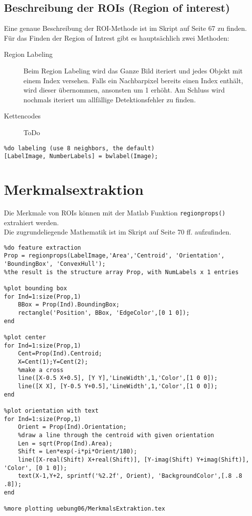 \subsection{Beschreibung der ROIs (Region of interest)}
Eine genaue Beschreibung der ROI-Methode ist im Skript auf Seite 67 zu finden.\\
Für das Finden der Region of Intrest gibt es hauptsächlich zwei Methoden:
\begin{description}
    \item[Region Labeling] Beim Region Labeling wird das Ganze Bild iteriert und jedes Objekt mit einem Index versehen. Falls ein Nachbarpixel bereits einen Index enthält, wird dieser übernommen, ansonsten um 1 erhöht. Am Schluss wird nochmals iteriert um allfällige Detektionsfehler zu finden.
    \item[Kettencodes] ToDo
\end{description}
\begin{lstlisting}
%do labeling (use 8 neighbors, the default)
[LabelImage, NumberLabels] = bwlabel(Image);
\end{lstlisting}

\section{Merkmalsextraktion}
Die Merkmale von ROIs können mit der Matlab Funktion \lstinline|regionprops()| extrahiert werden.\\
Die zugrundeliegende Mathematik ist im Skript auf Seite 70 ff. aufzufinden.
\begin{lstlisting}
%do feature extraction 
Prop = regionprops(LabelImage,'Area','Centroid', 'Orientation', 'BoundingBox', 'ConvexHull');
%the result is the structure array Prop, with NumLabels x 1 entries

%plot bounding box
for Ind=1:size(Prop,1)
    BBox = Prop(Ind).BoundingBox;
    rectangle('Position', BBox, 'EdgeColor',[0 1 0]);
end

%plot center
for Ind=1:size(Prop,1)
    Cent=Prop(Ind).Centroid;
    X=Cent(1);Y=Cent(2);
    %make a cross
    line([X-0.5 X+0.5], [Y Y],'LineWidth',1,'Color',[1 0 0]);
    line([X X], [Y-0.5 Y+0.5],'LineWidth',1,'Color',[1 0 0]);
end

%plot orientation with text
for Ind=1:size(Prop,1)
    Orient = Prop(Ind).Orientation;
    %draw a line through the centroid with given orientation
    Len = sqrt(Prop(Ind).Area);
    Shift = Len*exp(-i*pi*Orient/180);
    line([X-real(Shift) X+real(Shift)], [Y-imag(Shift) Y+imag(Shift)], 'Color', [0 1 0]);
    text(X-1,Y+2, sprintf('%2.2f', Orient), 'BackgroundColor',[.8 .8 .8]);
end

%more plotting uebung06/MerkmalsExtraktion.tex
\end{lstlisting}

